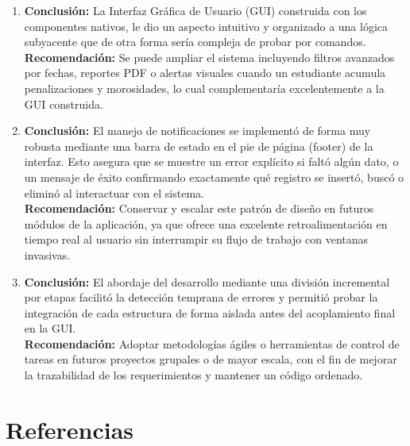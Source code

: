 \documentclass[11pt]{article}
\begin{document}
\begin{enumerate}
    \item \textbf{Conclusión:} La Interfaz Gráfica de Usuario (GUI) construida con los componentes nativos, le dio un aspecto intuitivo y organizado a una lógica subyacente que de otra forma sería compleja de probar por comandos.\\
    \textbf{Recomendación:} Se puede ampliar el sistema incluyendo filtros avanzados por fechas, reportes PDF o alertas visuales cuando un estudiante acumula penalizaciones y morosidades, lo cual complementaría excelentemente a la GUI construida.

    \item \textbf{Conclusión:} El manejo de notificaciones se implementó de forma muy robusta mediante una barra de estado en el pie de página (footer) de la interfaz. Esto asegura que se muestre un error explícito si faltó algún dato, o un mensaje de éxito confirmando exactamente qué registro se insertó, buscó o eliminó al interactuar con el sistema.\\
    \textbf{Recomendación:} Conservar y escalar este patrón de diseño en futuros módulos de la aplicación, ya que ofrece una excelente retroalimentación en tiempo real al usuario sin interrumpir su flujo de trabajo con ventanas invasivas.

    \item \textbf{Conclusión:} El abordaje del desarrollo mediante una división incremental por etapas facilitó la detección temprana de errores y permitió probar la integración de cada estructura de forma aislada antes del acoplamiento final en la GUI.\\
    \textbf{Recomendación:} Adoptar metodologías ágiles o herramientas de control de tareas en futuros proyectos grupales o de mayor escala, con el fin de mejorar la trazabilidad de los requerimientos y mantener un código ordenado.
\end{enumerate}

\section{Referencias}
\end{document}
